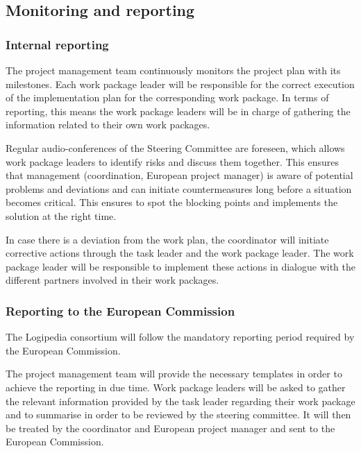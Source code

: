 \subsection*{Monitoring and reporting}

\subsubsection*{Internal reporting}

The project management team continuously monitors the project plan
with its milestones. Each work package leader will be
responsible for the correct execution of the implementation plan for
the corresponding work package. In terms of reporting, this means the work package leaders
will be in charge of gathering the information related to their own
work packages.

Regular audio-conferences of the Steering Committee are foreseen,
which allows work package leaders to identify risks and
discuss them together. This ensures that management (coordination,
European project manager) is aware of potential problems and
deviations and can initiate countermeasures long before a situation
becomes critical. This ensures to spot the blocking points and implements
the solution at the right time.


In case there is a deviation from the work plan, the 
coordinator will initiate corrective actions through the
task leader and the work package leader. The work package leader will
be responsible to implement these actions in dialogue with the
different partners involved in their work packages.

\subsubsection*{Reporting to the European Commission}

The Logipedia consortium will follow the mandatory reporting period
required by the European Commission. 

The project management team will provide the necessary templates in
order to achieve the reporting in due time. Work package leaders will
be asked to gather the relevant information provided by the task
leader regarding their work package and to summarise in order to be
reviewed by the steering committee. It will then be treated by the
coordinator and European project manager and sent to the
European Commission.

